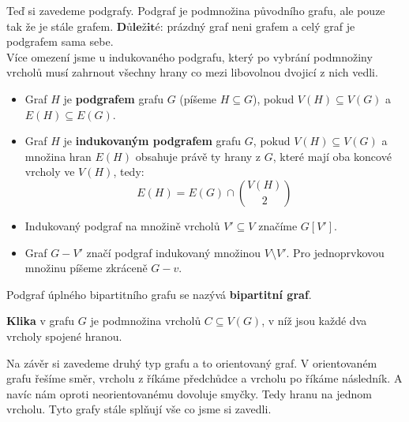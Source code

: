\bigskip

\noindent Teď si zavedeme podgrafy. Podgraf je podmnožina původního grafu, ale pouze tak že je stále grafem. $\textbf{Důležité:}$ prázdný graf neni grafem a celý graf je podgrafem sama sebe. \\
Více omezení jsme u indukovaného podgrafu, který po vybrání podmnožiny vrcholů musí zahrnout všechny hrany co mezi libovolnou dvojicí z nich vedli.

\medskip

\begin{definition}
\leavevmode
\begin{itemize}
    \item Graf $H$ je \textbf{podgrafem} grafu $G$ (píšeme $H \subseteq G$), pokud $V(H) \subseteq V(G)$ a $E(H) \subseteq E(G)$.
    \item Graf $H$ je \textbf{indukovaným podgrafem} grafu $G$, pokud $V(H) \subseteq V(G)$ a množina hran $E(H)$ obsahuje právě ty hrany z $G$, které mají oba koncové vrcholy ve $V(H)$, tedy:
    $$E(H) = E(G) \cap \binom{V(H)}{2}$$
    \item Indukovaný podgraf na množině vrcholů $V' \subseteq V$ značíme $G[V']$.
    \item Graf $G - V'$ značí podgraf indukovaný množinou $V \setminus V'$. Pro jednoprvkovou množinu píšeme zkráceně $G - v$.
\end{itemize}
\end{definition}



\medskip

\begin{definition}
    Podgraf úplného bipartitního grafu se nazývá \textbf{bipartitní graf}.
\end{definition}

\medskip

\begin{definition}[Klika]
\textbf{Klika} v grafu $G$ je podmnožina vrcholů $C \subseteq V(G)$, v níž jsou každé dva vrcholy spojené hranou.
\end{definition}



\bigskip

\noindent Na závěr si zavedeme druhý typ grafu a to orientovaný graf. V orientovaném grafu řešíme směr, vrcholu z říkáme předchůdce a vrcholu po říkáme následník. A navíc nám oproti neorientovanému dovoluje smyčky. Tedy hranu na jednom vrcholu. Tyto grafy stále splňují vše co jsme si zavedli.

